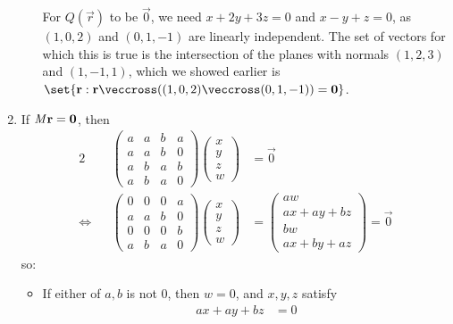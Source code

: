 \documentclass[fleqn,a4paper,11pt]{article}
\begin{document}
\begin{enumerate}[label=\textbf{\arabic*.}]
\begin{enumerate}[label=(\alph*)]
      For \(Q(\vec r)\) to be \(\vec 0\), we need \(x + 2y + 3z = 0\) and
      \(x - y + z = 0\), as \((1, 0, 2)\) and \((0, 1, -1)\) are linearly
      independent. The set of vectors for which this is true is the intersection
      of the planes with normals \((1, 2, 3)\) and \((1, -1, 1)\), which we
      showed earlier is
      \(\set{\vec r : \vec r \veccross
                      ((1, 0, 2) \veccross (0, 1, -1)) = \vec 0}\).
    \end{enumerate}
   \item
    If \(\mathit{M} \mathrm{\mathbf{r}} = \mathrm{\mathbf{0}}\), then
    \begin{alignat*}2
     && \begin{pmatrix}
      a & a & b & a \\
      a & a & b & 0 \\
      a & b & a & b \\
      a & b & a & 0
     \end{pmatrix}
     \begin{pmatrix}
      x \\ y \\ z \\ w
     \end{pmatrix}
      &= \vec 0 \\
     \iff{}&& \begin{pmatrix}
      0 & 0 & 0 & a \\
      a & a & b & 0 \\
      0 & 0 & 0 & b \\
      a & b & a & 0
     \end{pmatrix}
     \begin{pmatrix}
      x \\ y \\ z \\ w
     \end{pmatrix}
      &=
      \begin{pmatrix}
       aw \\ ax + ay + bz \\ bw \\ ax + by + az
      \end{pmatrix}
      = \vec 0
    \end{alignat*}
    so:
    \begin{itemize}
     \item If either of \(a, b\) is not \(0\), then \(w = 0\), and \(x, y, z\)
           satisfy
      \begin{align*}
       ax + ay + bz &= 0 \\

\end{align*}
\end{itemize}
\end{enumerate}
\end{document}
